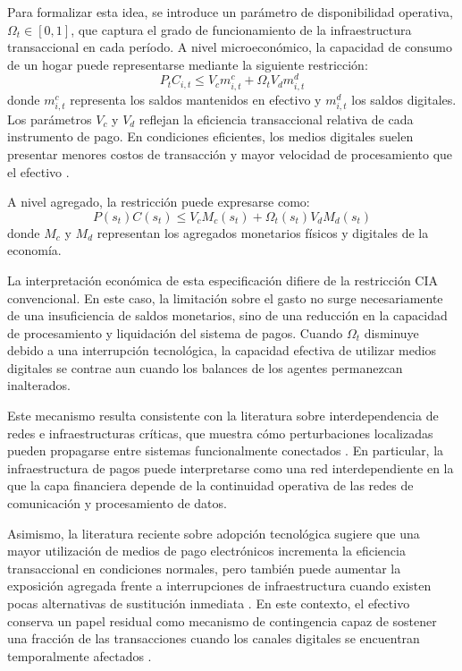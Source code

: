 Para formalizar esta idea, se introduce un par\'ametro de disponibilidad operativa, 
$\Omega_t \in [0,1]$, que captura el grado de funcionamiento de la infraestructura 
transaccional en cada per\'iodo. A nivel microecon\'omico, la capacidad de consumo 
de un hogar puede representarse mediante la siguiente restricci\'on:
\begin{equation}
P_t C_{i,t} \leq V_c m^c_{i,t} + \Omega_t V_d m^d_{i,t}
\end{equation}
donde $m^c_{i,t}$ representa los saldos mantenidos en efectivo y $m^d_{i,t}$ los 
saldos digitales. Los par\'ametros $V_c$ y $V_d$ reflejan la eficiencia transaccional 
relativa de cada instrumento de pago. En condiciones eficientes, los medios digitales 
suelen presentar menores costos de transacci\'on y mayor velocidad de procesamiento 
que el efectivo \citep{lagos2005unified, alvarez2009financial}.

A nivel agregado, la restricci\'on puede expresarse como:
\begin{equation}
P(s_t)C(s_t) \leq V_c M_c(s_t) + \Omega_t(s_t)V_d M_d(s_t)
\end{equation}
donde $M_c$ y $M_d$ representan los agregados monetarios f\'isicos y digitales de 
la econom\'ia.

La interpretaci\'on econ\'omica de esta especificaci\'on difiere de la restricci\'on 
CIA convencional. En este caso, la limitaci\'on sobre el gasto no surge necesariamente 
de una insuficiencia de saldos monetarios, sino de una reducci\'on en la capacidad 
de procesamiento y liquidaci\'on del sistema de pagos. Cuando $\Omega_t$ disminuye 
debido a una interrupci\'on tecnol\'ogica, la capacidad efectiva de utilizar medios 
digitales se contrae aun cuando los balances de los agentes permanezcan inalterados.

Este mecanismo resulta consistente con la literatura sobre interdependencia de 
redes e infraestructuras cr\'iticas, que muestra c\'omo perturbaciones localizadas 
pueden propagarse entre sistemas funcionalmente conectados \citep{buldyrev2010catastrophic, battiston2012liaisons, acemoglu2012network}. En particular, la infraestructura de pagos puede 
interpretarse como una red interdependiente en la que la capa financiera depende 
de la continuidad operativa de las redes de comunicaci\'on y procesamiento de datos.

Asimismo, la literatura reciente sobre adopci\'on tecnol\'ogica sugiere que una mayor 
utilizaci\'on de medios de pago electr\'onicos incrementa la eficiencia transaccional 
en condiciones normales, pero tambi\'en puede aumentar la exposici\'on agregada 
frente a interrupciones de infraestructura cuando existen pocas alternativas de 
sustituci\'on inmediata \citep{crouzet2023shocks}. En este contexto, el efectivo conserva 
un papel residual como mecanismo de contingencia capaz de sostener una fracci\'on 
de las transacciones cuando los canales digitales se encuentran temporalmente 
afectados \citep{alvarez2009financial}.

